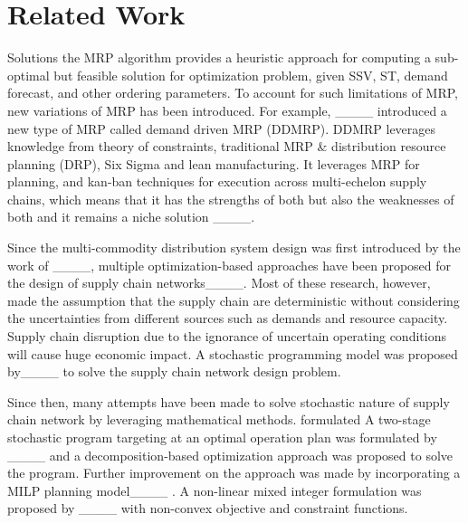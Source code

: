 \section{Related Work}
\label{section:related_work}

Solutions the MRP algorithm provides a heuristic approach for computing a sub-optimal but feasible solution for optimization problem, given SSV, ST, demand forecast, and other ordering parameters. To account for such limitations of MRP, new variations of MRP has been introduced. For example, ____ introduced a new type of MRP called demand driven MRP (DDMRP). DDMRP leverages knowledge from theory of constraints, traditional MRP \& distribution resource planning (DRP), Six Sigma and lean manufacturing. It leverages MRP for planning, and kan-ban techniques for execution across multi-echelon supply chains, which means that it has the strengths of both but also the weaknesses of both and it remains a niche solution ____.

Since the multi-commodity distribution system design was first introduced by the work of ____, multiple optimization-based approaches have been proposed for the design of supply chain networks____. Most of these research, however, made the assumption that the supply chain are deterministic without considering the uncertainties from different sources such as demands and resource capacity. Supply chain disruption due to the ignorance of uncertain operating conditions will cause huge economic impact. A stochastic programming model was proposed by____ to solve the supply chain network design problem.

Since then, many attempts have been made to solve stochastic nature of supply chain network by leveraging mathematical methods. formulated A two-stage stochastic program targeting at an optimal operation plan was formulated by ____ and a decomposition-based optimization approach was proposed to solve the program. Further improvement on the approach was made by incorporating a MILP planning model____ . A non-linear mixed integer formulation was proposed by ____ with non-convex objective and constraint functions.

